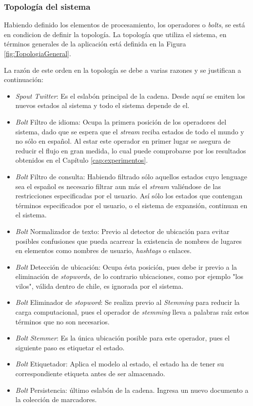 \subsubsection*{Topología del sistema}
\label{subsubsec:topologiaSistema}

Habiendo definido los elementos de procesamiento, los operadores o \textit{bolts}, se está en condicion de definir la topología. La topología que utiliza el sistema, en términos generales de la aplicación está definida en la Figura \ref{fig:TopologiaGeneral}.

La razón de este orden en la topología se debe a varias razones y se justifican a continuación:

\begin{itemize}
\item \textit{Spout Twitter}: Es el eslabón principal de la cadena. Desde aquí se emiten los nuevos estados al sistema y todo el sistema depende de el. 
\item \textit{Bolt} Filtro de idioma: Ocupa la primera posición de los operadores del sistema, dado que se espera que el \textit{stream} reciba estados de todo el mundo y no sólo en español. Al estar este operador en primer lugar se asegura de reducir el flujo en gran medida, lo cual puede comprobarse por los resultados obtenidos en el Capítulo \ref{cap:experimentos}.
\item \textit{Bolt} Filtro de consulta: Habiendo filtrado sólo aquellos estados cuyo lenguage sea el español es necesario filtrar aun más el \textit{stream} valiéndose de las restricciones especificadas por el usuario. Así sólo los estados que contengan términos especificados por el usuario, o el sistema de expansión, continuan en el sistema.
\item\textit{Bolt} Normalizador de texto: Previo al detector de ubicación para evitar posibles confusiones que pueda acarrear la existencia de nombres de lugares en elementos como nombres de usuario, \textit{hashtags} o enlaces.
\item\textit{Bolt} Detección de ubicación: Ocupa ésta posición, pues debe ir previo a la eliminación de \textit{stopwords}, de lo contrario ubicaciones, como por ejemplo "los vilos", válida dentro de chile, es ignorada por el sistema.
\item\textit{Bolt} Eliminador de \textit{stopword}: Se realiza previo al \textit{Stemming} para reducir la carga computacional, pues el operador de \textit{stemming} lleva a palabras raíz estos términos que no son necesarios.
\item\textit{Bolt} \textit{Stemmer}: Es la única ubicación posible para este operador, pues el siguiente paso es etiquetar el estado.
\item\textit{Bolt} Etiquetador: Aplica el modelo al estado, el estado ha de tener su correspondiente etiqueta antes de ser almacenado.
\item\textit{Bolt} Persistencia: último eslabón de la cadena. Ingresa un nuevo documento a la colección de marcadores.
\end{itemize}

